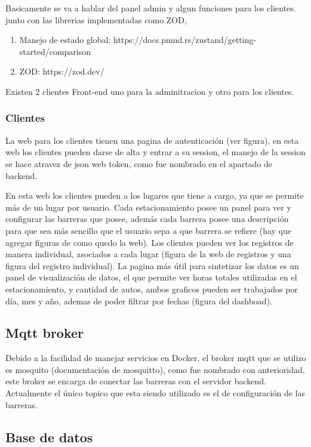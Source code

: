 Basicamente se va a hablar del panel admin y algun funciones para los clientes. junto con las librerias implementadas como ZOD,

\begin{enumerate}
    \item Manejo de estado global: https://docs.pmnd.rs/zustand/getting-started/comparison
    \item ZOD: https://zod.dev/
\end{enumerate}

Existen 2 clientes Front-end uno para la adminitracion y otro para los clientes.

\subsubsection{Clientes}

La web para los clientes tienen una pagina de autenticación (ver figura), en esta web los clientes pueden darse de alta y entrar a su session, el manejo de la session se hace atravez de json web token, como fue nombrado en el apartado de backend.

En esta web los clientes pueden a los lugares que tiene a cargo, ya que se permite más de un lugar por usuario. Cada estacionamiento posee un panel para ver y configurar las barreras que posee, además cada barrera posee una descripción para que sea más sencillo que el usuario sepa a que barrera se refiere (hay que agregar figuras de como quedo la web). Los clientes pueden ver los registros de manera individual, asociados a cada lugar (figura de la web de registros y una figura del registro individual). La pagina más útil para sintetizar los datos es un panel de visualización de datos, el que permite ver horas totales utilizadas en el estacionamiento, y cantidad de autos, ambos graficos pueden ser trabajados por día, mes y año, ademas de poder filtrar por fechas (figura del dashboad).

\subsection{Mqtt broker}

Debido a la facilidad de manejar servicios en Docker, el broker mqtt que se utilizo es mosquito (documentación de mosquitto), como fue nombrado con anterioridad, este broker se encarga de conectar las barreras con el servidor backend. Actualmente el único topico que esta siendo utilizado es el de configuración de las barreras.

\subsection{Base de datos}

